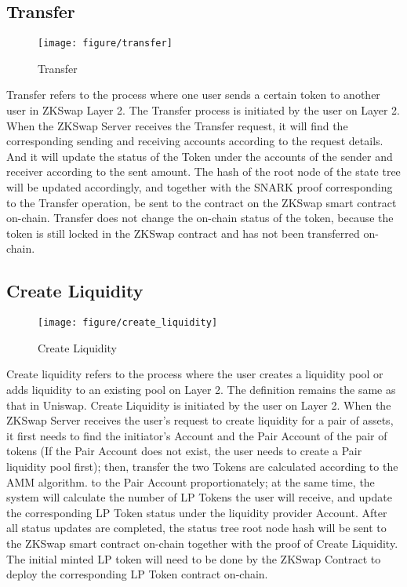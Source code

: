 \documentclass[]{template/llncs}
\begin{document}
\subsection{Transfer}

\begin{figure}[htbp]
\centering
\texttt{[image: figure/transfer]}
\caption{Transfer}
\label{fig:transfer}
\end{figure}

Transfer refers to the process where one user sends a certain token to another user in ZKSwap Layer 2. The Transfer process is initiated by the user on Layer 2. When the ZKSwap Server receives the Transfer request, it will find the corresponding sending and receiving accounts according to the request details.
And it will update the status of the Token under the accounts of the sender and receiver according to the sent amount. The hash of the root node of the state tree will be updated accordingly, and together with the SNARK proof corresponding to the Transfer operation, be sent to the contract on the ZKSwap smart contract on-chain. Transfer does not change the on-chain status of the token, because the token is still locked in the ZKSwap contract and has not been transferred on-chain.


\subsection{Create Liquidity}

\begin{figure}[htbp]
\centering
\texttt{[image: figure/create\_liquidity]}
\caption{Create Liquidity}
\label{fig:create_liquidity}
\end{figure}

Create liquidity refers to the process where the user creates a liquidity pool or adds liquidity to an existing pool on Layer 2. The definition remains the same as that in Uniswap. 
Create Liquidity is initiated by the user on Layer 2. When the ZKSwap Server receives the user’s request to create liquidity for a pair of assets, it first needs to find the initiator’s Account and the Pair Account of the pair of tokens (If the Pair Account does not exist, the user needs to create a Pair liquidity pool first);  then, transfer the two Tokens are calculated according to the AMM algorithm.
to the Pair Account proportionately; at the same time, the system will calculate the number of LP Tokens the user will receive, and update the corresponding LP Token status under the liquidity provider Account. After all status updates are completed, the status tree root node hash will be sent to the ZKSwap smart contract on-chain together with the proof of Create Liquidity. The initial minted LP token will need to be done by the ZKSwap Contract to deploy the corresponding LP Token contract on-chain.
\end{document}
